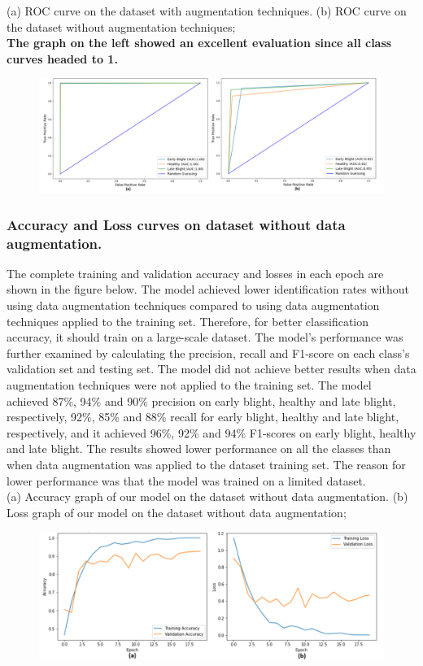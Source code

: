 \documentclass[11pt]{report}
\begin{document}
(a) ROC curve on the dataset with augmentation techniques. (b) ROC curve on the dataset without augmentation techniques;\\
\textbf{The graph on the left showed an excellent evaluation since all class curves headed to 1.}\\
\begin{figure}[h]
	\centerline{\small 
		\includegraphics[height=0.2\textheight]  {p9}}
\end{figure}


\subsubsection*{Accuracy and Loss curves on dataset without data augmentation.}
The complete training and validation accuracy and losses in each epoch are shown in the figure below. The model achieved lower identification rates without using data augmentation techniques
compared to using data augmentation techniques applied to the training set. Therefore, for better classification accuracy, it should train on a large-scale dataset.
The model’s performance was further examined by calculating
the precision, recall and F1-score on each class’s validation set and testing set. The model did not achieve better results when data augmentation techniques were
not applied to the training set. The model achieved 87\%, 94\% and 90\% precision on early blight,
healthy and late blight, respectively, 92\%, 85\% and 88\% recall for early blight, healthy
and late blight, respectively, and it achieved 96\%, 92\% and 94\% F1-scores on early blight,
healthy and late blight. The results showed lower performance on all the classes than
when data augmentation was applied to the dataset training set. The reason for lower
performance was that the model was trained on a limited dataset.\\


(a) Accuracy graph of our model on the dataset without data augmentation. (b) Loss graph of our model on the dataset without data augmentation;\\
\begin{figure}[h]
	\centerline{\small 
		\includegraphics[height=0.20\textheight]  {p10}}
\end{figure}
\end{document}
